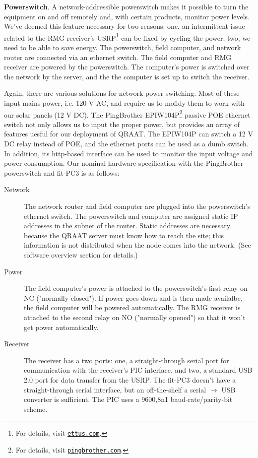 \documentclass[letter]{article}
\newcounter{foot}
\begin{document}
\textbf{Powerswitch}. A network-addressible powerswitch makes it possible to turn the 
equipment on and off remotely and, with certain products, monitor power levels. We've 
deemed this feature necessary for two reasons: one, an intermittent issue related to 
the RMG receiver's USRP\footnote{For details, visit
\href{https://www.ettus.com}{\tt ettus.com}.} can be fixed by 
cycling the power; two, we need to be able to save energy. The powerswitch, field computer,
and network router are connected via an ethernet switch. The field computer and RMG 
receiver are powered by the powerswitch. The computer's power is switched over the 
network by the server, and the the computer is set up to switch the receiver. 

Again, there are various solutions for network power switching. Most of these input 
mains power, i.e. 120 V AC, and require us to mofidy them to work with our solar 
panels (12 V DC). The PingBrother EPIW104P\footnote{For details, visit
\href{http://www.pingbrother.com}{\tt pingbrother.com}.} passive POE ethernet switch 
not only allows us to input the proper power, but provides an array of features 
uesful for our deployment of QRAAT. The EPIW104P can switch a 12 V DC relay instead of
POE, and the ethernet ports can be used as a dumb switch. In addition, its http-based 
interface can be used to monitor the input voltage and power consumption. Our nominal 
hardware specification with the PingBrother powerswitch and fit-PC3 is as follows: 

\begin{description}
  \item[\quad Network] The network router and field computer are plugged into the 
    powerswitch's ethernet switch. The powerswitch and computer are assigned static
    IP addresses in the subnet of the router. Static addresses are necessary because 
    the QRAAT server must know how to reach the site; this information is not 
    distributed when the node comes into the network. (See software overview section 
    for details.) 
    
  \item[\quad Power] The field computer's power is attached to the powerswitch's 
    first relay on NC ("normally closed"). If power goes down and is then made 
    availalbe, the field computer will be powered automatically. The RMG receiver is
    attached to the second relay on NO ("normally opened") so that it won't get power 
    automatically. 
    
  \item[\quad Receiver] The receiver has a two ports: one, a straight-through serial 
    port for communication with the receiver's PIC interface, and two, a standard USB
    2.0 port for data transfer from the USRP. The fit-PC3 doesn't have a straight-through
    serial interface, but an off-the-shelf a serial $\rightarrow$ USB converter is 
    sufficient. The PIC uses a 9600,8n1 baud-rate/parity-bit scheme.  
\end{description}
 
\end{document}
